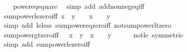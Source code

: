\begin{isabellebody}
%
\isadelimproof
\ \ %
\endisadelimproof
%
\isatagproof
{}\isamarkupfalse%
\ power{}{\isacharunderscore}{\kern0pt}eq{\isacharunderscore}{\kern0pt}square\ \isamarkupfalse%
\ {\isacharparenleft}{\kern0pt}simp\ add{\isacharcolon}{\kern0pt}\ add{\isacharunderscore}{\kern0pt}nonneg{\isacharunderscore}{\kern0pt}eq{\isacharunderscore}{\kern0pt}{}{\isacharunderscore}{\kern0pt}iff{\isacharparenright}{\kern0pt}%
\endisatagproof
{\isafoldproof}%
%
\isadelimproof
\isanewline
%
\endisadelimproof
\isanewline
{}\isamarkupfalse%
\ sum{\isacharunderscore}{\kern0pt}power{}{\isacharunderscore}{\kern0pt}le{\isacharunderscore}{\kern0pt}zero{\isacharunderscore}{\kern0pt}iff{\isacharcolon}{\kern0pt}\ {\isachardoublequoteopen}x\ {\isacharplus}{\kern0pt}\ y\ {\isasymle}\ {}\ {\isasymlongleftrightarrow}\ x\ {\isacharequal}{\kern0pt}\ {}\ {\isasymand}\ y\ {\isacharequal}{\kern0pt}\ {}{\isachardoublequoteclose}\isanewline
%
\isadelimproof
\ \ %
\endisadelimproof
%
\isatagproof
{}\isamarkupfalse%
\ {\isacharparenleft}{\kern0pt}simp\ add{\isacharcolon}{\kern0pt}\ le{\isacharunderscore}{\kern0pt}less\ sum{\isacharunderscore}{\kern0pt}power{}{\isacharunderscore}{\kern0pt}eq{\isacharunderscore}{\kern0pt}zero{\isacharunderscore}{\kern0pt}iff\ not{\isacharunderscore}{\kern0pt}sum{\isacharunderscore}{\kern0pt}power{}{\isacharunderscore}{\kern0pt}lt{\isacharunderscore}{\kern0pt}zero{\isacharparenright}{\kern0pt}%
\endisatagproof
{\isafoldproof}%
%
\isadelimproof
\isanewline
%
\endisadelimproof
\isanewline
{}\isamarkupfalse%
\ sum{\isacharunderscore}{\kern0pt}power{}{\isacharunderscore}{\kern0pt}gt{\isacharunderscore}{\kern0pt}zero{\isacharunderscore}{\kern0pt}iff{\isacharcolon}{\kern0pt}\ {\isachardoublequoteopen}{}\ {\isacharless}{\kern0pt}\ x\ {\isacharplus}{\kern0pt}\ y\ {\isasymlongleftrightarrow}\ x\ {\isasymnoteq}\ {}\ {\isasymor}\ y\ {\isasymnoteq}\ {}{\isachardoublequoteclose}\isanewline
%
\isadelimproof
\ \ %
\endisadelimproof
%
\isatagproof
{}\isamarkupfalse%
\ not{\isacharunderscore}{\kern0pt}le\ {\isacharbrackleft}{\kern0pt}symmetric{\isacharbrackright}{\kern0pt}\ \isamarkupfalse%
\ {\isacharparenleft}{\kern0pt}simp\ add{\isacharcolon}{\kern0pt}\ sum{\isacharunderscore}{\kern0pt}power{}{\isacharunderscore}{\kern0pt}le{\isacharunderscore}{\kern0pt}zero{\isacharunderscore}{\kern0pt}iff{\isacharparenright}{\kern0pt}%

\end{isabellebody}
